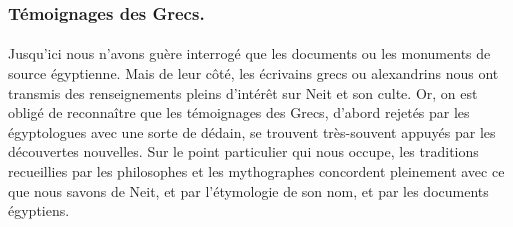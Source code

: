 \documentclass[a4paper, 11pt, oneside]{article}
\begin{document}
\subsubsection{Témoignages des Grecs.}
\paragraph{}
Jusqu'ici nous n'avons guère interrogé que les documents ou les monuments de source égyptienne. Mais de leur côté, les écrivains grecs ou alexandrins nous ont transmis des renseignements pleins d'intérêt sur Neit et son culte. Or, on est obligé de reconnaître que les témoignages des Grecs, d'abord rejetés par les égyptologues avec une sorte de dédain, se trouvent très-souvent appuyés par les découvertes nouvelles. Sur le point particulier qui nous occupe, les traditions recueillies par les philosophes et les mythographes concordent pleinement avec ce que nous savons de Neit, et par l'étymologie de son nom, et par les documents égyptiens.
\end{document}
